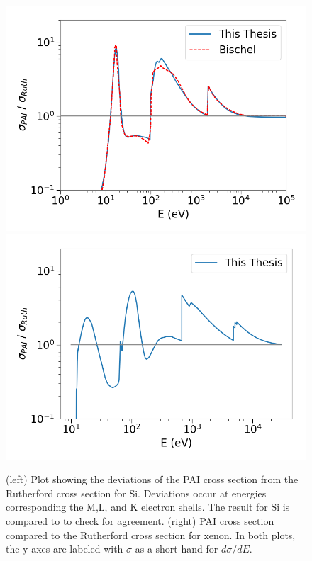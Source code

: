 \begin{figure}[htbp]
\begin{center}
\includegraphics[width=\halffig]{figures/lips/pai_si.png}
\includegraphics[width=\halffig]{figures/lips/pai_xe.png}
\caption{(left) Plot showing the deviations of the \acs{PAI} cross section from the Rutherford cross section for Si. Deviations occur at energies corresponding the M,L, and K electron shells. The result for Si is compared to \cite{Bichsel:2006} to check for agreement. (right) \acs{PAI} cross section compared to the Rutherford cross section for xenon. In both plots, the y-axes are labeled with $\sigma$ as a short-hand for $d\sigma/dE$.}
\label{fig:sigma_pai}
\end{center}
\end{figure}

